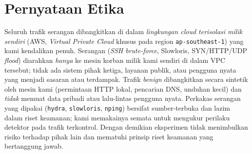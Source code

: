 \documentclass[11pt,a4paper]{article}
\begin{document}
\section*{Pernyataan Etika}
Seluruh trafik serangan dibangkitkan di dalam \emph{lingkungan cloud terisolasi
milik sendiri} (AWS, \emph{Virtual Private Cloud} khusus pada region
\texttt{ap-southeast-1}) yang kami kendalikan penuh. Serangan (\emph{SSH
brute-force}, Slowloris, SYN/HTTP/UDP \emph{flood}) diarahkan \emph{hanya} ke mesin
korban milik kami sendiri di dalam VPC tersebut; tidak ada sistem pihak ketiga,
layanan publik, atau pengguna nyata yang menjadi sasaran atau terdampak. Trafik
\emph{benign} dibangkitkan secara sintetik oleh mesin kami (permintaan HTTP lokal,
pencarian DNS, unduhan kecil) dan \emph{tidak} memuat data pribadi atau lalu-lintas
pengguna nyata. Perkakas serangan yang dipakai (\texttt{hydra}, \texttt{slowloris},
\texttt{nping}) bersifat sumber-terbuka dan lazim dalam riset keamanan; kami
memakainya semata untuk mengukur perilaku detektor pada trafik terkontrol. Dengan
demikian eksperimen tidak menimbulkan risiko terhadap pihak lain dan mematuhi
prinsip riset keamanan yang bertanggung jawab.
\end{document}
